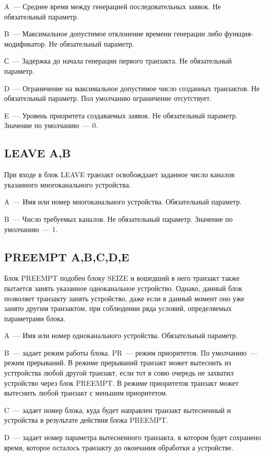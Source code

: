 A~--- Среднее время между генерацией последовательных заявок. Не обязательный параметр.

B~--- Максимальное допустимое отклонение времени генерации либо функция-модификатор. Не обязательный параметр.

С~--- Задержка до начала генерации первого транзакта. Не обязательный параметр.

D~--- Ограничение на максимальное допустимое число созданных транзактов. Не обязательный параметр. Пол умолчанию ограничение отсутствует.

E~--- Уровень приоритета создаваемых заявок. Не обязательный параметр. Значение по умолчанию~--- 0.

\subsection*{LEAVE A,B}

При входе в блок LEAVE транзакт освобождаает заданное число каналов указанного многоканального устройства.

A~--- Имя или номер многоканального устройства. Обязательный параметр.

B~--- Число требуемых каналов. Не обязательный параметр. Значение по умолчанию~--- 1.

\subsection*{PREEMPT A,B,C,D,E}

Блок PREEMPT подобен блоку SEIZE и вошедший в него транзакт также пытается занять указанное одноканальное устройство. Однако, данный блок позволяет транзакту занять устройство, даже если в данный момент оно уже занято другим транзактом, при соблюдении ряда условий, определяемых параметрами блока.

A~--- Имя или номер одноканального устройства. Обязательный параметр.

B~--- задает режим работы блока. PR~--- режим приоритетов. По умолчанию~--- режим прерываний. В режиме прерываний транзакт может вытеснить из усттройства любой другой транзакт, если тот в совю очередь не захватил устройство через блок PREEMPT. В режиме приоритетов транзакт может вытеснить любой транзакт с меньшим приоритетом.

C~--- задает номер блока, куда будет направлен транзакт вытесненный и устройства в результате действия блока PREEMPT. 

D~--- задает номер параметра вытесненного транзакта, в  котором будет сохранено время, которое осталось транзакту до окончания обработки а устройстве.

